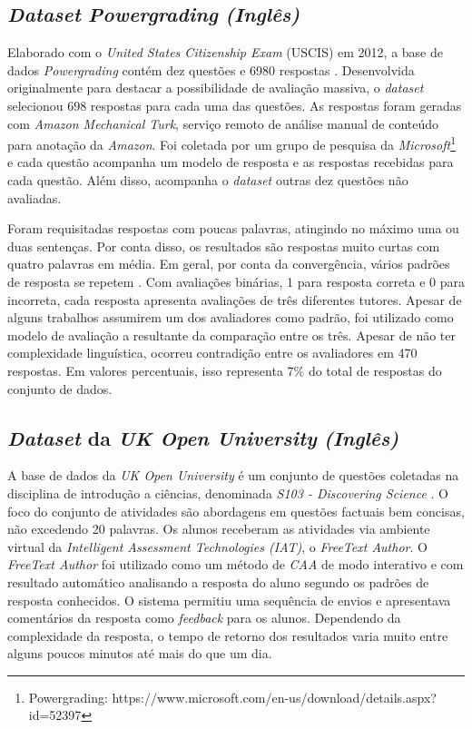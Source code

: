 \subsection{\textit{Dataset} \textit{Powergrading} \textit{(Inglês)}}
\label{powergrading-db}
Elaborado com o \textit{United States Citizenship Exam} (USCIS) em 2012, a base de dados \textit{Powergrading} contém dez questões e 6980 respostas \cite{basu2013}. Desenvolvida originalmente para destacar a possibilidade de avaliação massiva, o \textit{dataset} selecionou 698 respostas para cada uma das questões. As respostas foram geradas com \textit{Amazon Mechanical Turk}, serviço remoto de análise manual de conteúdo para anotação da \textit{Amazon}. Foi coletada por um grupo de pesquisa da \textit{Microsoft}\footnote{Powergrading: https://www.microsoft.com/en-us/download/details.aspx?id=52397} e cada questão acompanha um modelo de resposta e as respostas recebidas para cada questão.  Além disso, acompanha o \textit{dataset} outras dez questões não avaliadas.

Foram requisitadas respostas com poucas palavras, atingindo no máximo uma ou duas sentenças. Por conta disso, os resultados são respostas muito curtas com quatro palavras em média. Em geral, por conta da convergência, vários padrões de resposta se repetem \cite{riordan2017}. Com avaliações binárias, 1 para resposta correta e 0 para incorreta, cada resposta apresenta avaliações de três diferentes tutores. Apesar de alguns trabalhos assumirem um dos avaliadores como padrão, foi utilizado como modelo de avaliação a resultante da comparação entre os três. Apesar de não ter complexidade linguística, ocorreu contradição entre os avaliadores em 470 respostas. Em valores percentuais, isso representa 7\% do total de respostas do conjunto de dados.

\subsection{\textit{Dataset} da \textit{UK Open University} \textit{(Inglês)}}
\label{openunv-db}

A base de dados da \textit{UK Open University} é um conjunto de questões coletadas na disciplina de introdução a ciências, denominada \textit{S103 - Discovering Science} \cite{jordan2012}. O foco do conjunto de atividades são abordagens em questões factuais bem concisas, não excedendo 20 palavras. Os alunos receberam as atividades via ambiente virtual da \textit{Intelligent Assessment Technologies (IAT)}, o \textit{FreeText Author}. O \textit{FreeText Author} foi utilizado como um método de \textit{CAA} de modo interativo e com resultado automático analisando a resposta do aluno segundo os padrões de resposta conhecidos. O sistema permitiu uma sequência de envios e apresentava comentários da resposta como \textit{feedback} para os alunos. Dependendo da complexidade da resposta, o tempo de retorno dos resultados varia muito entre alguns poucos minutos até mais do que um dia.

